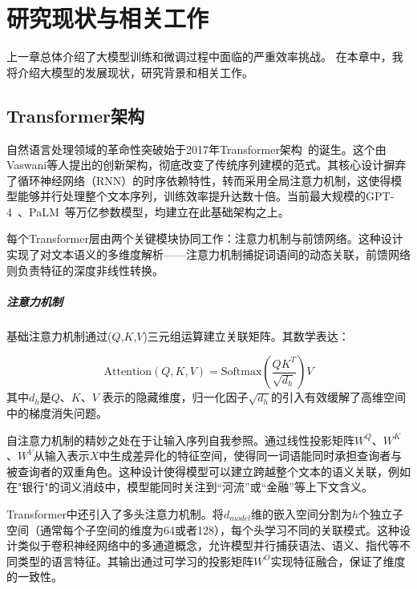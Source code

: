 
\chapter{研究现状与相关工作}

上一章总体介绍了大模型训练和微调过程中面临的严重效率挑战。
在本章中，我将介绍大模型的发展现状，研究背景和相关工作。


\section{Transformer架构}
自然语言处理领域的革命性突破始于2017年Transformer架构~\cite{Vaswani+2017}的诞生。这个由Vaswani等人提出的创新架构，彻底改变了传统序列建模的范式。其核心设计摒弃了循环神经网络（RNN）的时序依赖特性，转而采用全局注意力机制，这使得模型能够并行处理整个文本序列，训练效率提升达数十倍。当前最大规模的GPT-4~\cite{openai2023gpt4}、PaLM~\cite{chowdhery2023palm}等万亿参数模型，均建立在此基础架构之上。

每个Transformer层由两个关键模块协同工作：注意力机制与前馈网络。这种设计实现了对文本语义的多维度解析——注意力机制捕捉词语间的动态关联，前馈网络则负责特征的深度非线性转换。

\paragraph{注意力机制}
基础注意力机制通过($Q$,$K$,$V$)三元组运算建立关联矩阵。其数学表达：

\begin{equation}
    \text{Attention}(Q, K, V) = \text{Softmax}(\frac{QK^T}{\sqrt{d_h}})V
\end{equation}
其中$d_h$是$Q$、$K$、$V$ 表示的隐藏维度，归一化因子$\sqrt{d_h}$的引入有效缓解了高维空间中的梯度消失问题。

自注意力机制的精妙之处在于让输入序列自我参照。通过线性投影矩阵$W^Q$、$W^K$、$W^V$从输入表示$X$中生成差异化的特征空间，使得同一词语能同时承担查询者与被查询者的双重角色。这种设计使得模型可以建立跨越整个文本的语义关联，例如在"银行"的词义消歧中，模型能同时关注到“河流”或“金融”等上下文含义。

Transformer中还引入了多头注意力机制。将$d_{model}$维的嵌入空间分割为$h$个独立子空间（通常每个子空间的维度为64或者128），每个头学习不同的关联模式。这种设计类似于卷积神经网络中的多通道概念，允许模型并行捕获语法、语义、指代等不同类型的语言特征。其输出通过可学习的投影矩阵$W^O$实现特征融合，保证了维度的一致性。

